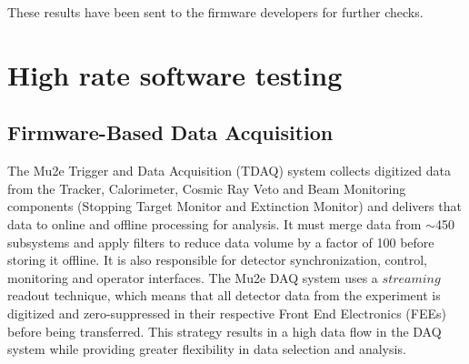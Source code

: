 These results have been sent to the firmware developers for further checks.



















\section{High rate software testing}
\subsection{Firmware-Based Data Acquisition}
The Mu2e Trigger and Data Acquisition (TDAQ) system collects digitized data from the Tracker, 
Calorimeter, Cosmic Ray Veto and Beam Monitoring components (Stopping Target Monitor and Extinction Monitor) 
and delivers that data to online and offline processing for analysis. It must merge data from $\sim$450 subsystems 
and apply filters to reduce data volume by a factor of 100 before storing it offline. It is also responsible for 
detector synchronization, control, monitoring and operator interfaces. The Mu2e DAQ system uses a $streaming$ readout technique, 
which means that all detector data from the experiment is digitized and zero-suppressed in their respective Front End Electronics 
(FEEs) before being transferred. This strategy results in a high data flow in the DAQ system while providing greater flexibility in data selection and analysis.
